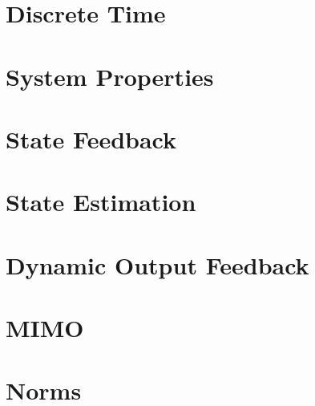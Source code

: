 \documentclass[numerate]{cheatsheet}
\author{Noa Sendlhofer - nsendlhofer@ethz.ch}
\begin{document}
\section{Discrete Time}
	
	
	
	
	
\section{System Properties}
	
	
	
	
	
\section{State Feedback}
	
	
\section{State Estimation}
	
	
\section{Dynamic Output Feedback}
	
\section{MIMO}
	
	
	
	
	
\section{Norms}
	
	
	
\end{document}

